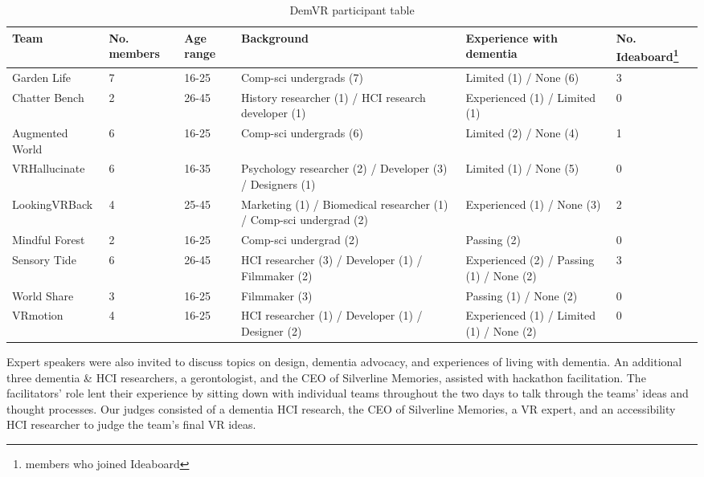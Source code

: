 \begin{table}[htp]
\begin{tabularx}{\textwidth}{@{} YYYYYY @{}}
\hline
\textbf{Team} & \textbf{No. members} & \textbf{Age range} & \textbf{Background} & \textbf{Experience with dementia} & \textbf{No. Ideaboard\footnote{members who joined Ideaboard}} \\ \hline 
Garden Life & 7 & 16-25 & Comp-sci undergrads (7) & Limited (1) / None (6) & 3 \\ \hline
Chatter Bench & 2 & 26-45 & History researcher (1) / HCI research developer   (1) & Experienced (1) / Limited (1) & 0 \\ \hline
Augmented World & 6 & 16-25 & Comp-sci undergrads (6) & Limited (2) / None (4) & 1 \\ \hline
VRHallucinate & 6 & 16-35 & Psychology researcher (2) / Developer (3) /   Designers (1) & Limited (1) / None (5) & 0 \\ \hline
LookingVRBack & 4 & 25-45 & Marketing (1) / Biomedical researcher (1) /   Comp-sci undergrad (2) & Experienced (1) / None (3) & 2 \\ \hline
Mindful Forest & 2 & 16-25 & Comp-sci undergrad (2) & Passing (2) & 0 \\ \hline
Sensory Tide & 6 & 26-45 & HCI researcher (3) / Developer (1) / Filmmaker   (2) & Experienced (2) / Passing (1) / None (2) & 3 \\ \hline
World Share & 3 & 16-25 & Filmmaker (3) & Passing (1) / None (2) & 0 \\ \hline
VRmotion & 4 & 16-25 & HCI researcher (1) / Developer (1) / Designer   (2) & Experienced (1) / Limited (1) / None (2) & 0 \\ \hline
\end{tabularx}
\caption{DemVR participant table}
\label{table:DemVRDemographic}
\end{table}

Expert speakers were also invited to discuss topics on design, dementia advocacy, and experiences of living with dementia. An additional three dementia \& HCI researchers, a gerontologist, and the CEO of Silverline Memories, assisted with hackathon facilitation. The facilitators' role lent their experience by sitting down with individual teams throughout the two days to talk through the teams' ideas and thought processes. Our judges consisted of a dementia HCI research, the CEO of Silverline Memories, a VR expert, and an accessibility HCI researcher to judge the team's final VR ideas.

